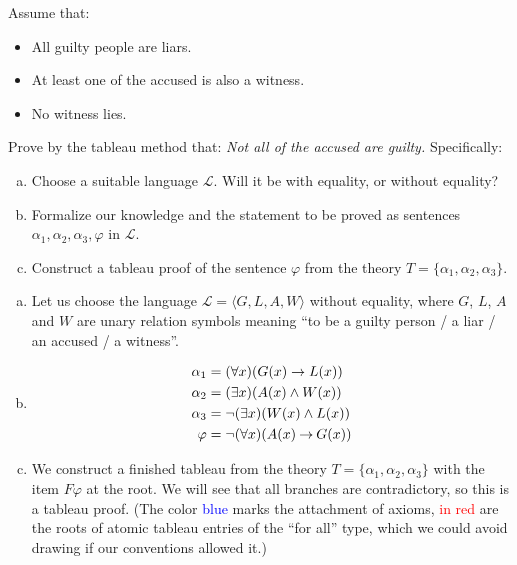        
\begin{problem}

    Assume that:
    \begin{itemize}\it
        \item All guilty people are liars.
        \item At least one of the accused is also a witness.
        \item No witness lies.
    \end{itemize}

    Prove by the tableau method that: {\it Not all of the accused are guilty.} Specifically:
    \begin{enumerate}[(a)]
        \item Choose a suitable language $\mathcal L$. Will it be with equality, or without equality?        
        \item Formalize our knowledge and the statement to be proved as sentences $\alpha_1,\alpha_2,\alpha_3,\varphi$ in $\mathcal L$.
        \item Construct a tableau proof of the sentence $\varphi$ from the theory $T=\{\alpha_1,\alpha_2,\alpha_3\}$.
    \end{enumerate}

    \begin{solution}

        \begin{enumerate}[(a)]
            \item Let us choose the language $\mathcal L=\langle G,L,A,W\rangle$ without equality, where $G$, $L$, $A$ and $W$ are unary relation symbols meaning ``to be a guilty person / a liar / an accused / a witness''.
            \item 
            \begin{align*}
                \alpha_1 & = (\forall x)(G(x)\to L(x)) \\
                \alpha_2 & = (\exists x)(A(x)\land W(x)) \\
                \alpha_3 & = \neg(\exists x)(W(x)\land L(x)) \\
                \varphi & = \neg (\forall x)(A(x)\mathbin{\rightarrow} G(x))
            \end{align*}
            \item We construct a finished tableau from the theory $T=\{\alpha_1,\alpha_2,\alpha_3\}$ with the item $F\varphi$ at the root. We will see that all branches are contradictory, so this is a tableau proof. (The color \textcolor{blue}{blue} marks the attachment of axioms, \textcolor{red}{in red} are the roots of atomic tableau entries of the ``for all'' type, which we could avoid drawing if our conventions allowed it.)
            

\end{enumerate}
\end{solution}
\end{problem}

